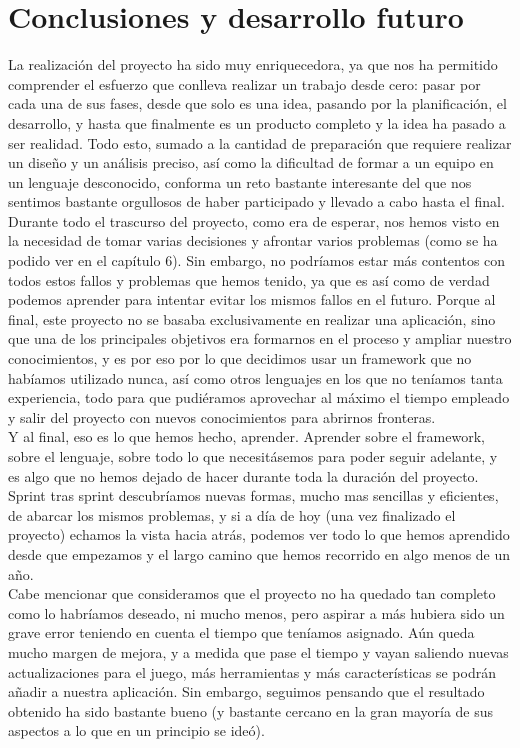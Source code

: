 \chapter{Conclusiones y desarrollo futuro}\label{pruebas}

La realización del proyecto ha sido muy enriquecedora, ya que nos ha permitido comprender el esfuerzo que conlleva realizar un trabajo desde cero: pasar por cada una de sus fases, desde que solo es una idea, pasando por la planificación, el desarrollo, y hasta que finalmente es un producto completo y la idea ha pasado a ser realidad. Todo esto, sumado a la cantidad de preparación que requiere realizar un diseño y un análisis preciso, así como la dificultad de formar a un equipo en un lenguaje desconocido, conforma un reto bastante interesante del que nos sentimos bastante orgullosos de haber participado y llevado a cabo hasta el final.\\

Durante todo el trascurso del proyecto, como era de esperar, nos hemos visto en la necesidad de tomar varias decisiones y afrontar varios problemas (como se ha podido ver en el capítulo 6). Sin embargo, no podríamos estar más contentos con todos estos fallos y problemas que hemos tenido, ya que es así como de verdad podemos aprender para intentar evitar los mismos fallos en el futuro. Porque al final, este proyecto no se basaba exclusivamente en realizar una aplicación, sino que una de los principales objetivos era formarnos en el proceso y ampliar nuestro conocimientos, y es por eso por lo que decidimos usar un framework que no habíamos utilizado nunca, así como otros lenguajes en los que no teníamos tanta experiencia, todo para que pudiéramos aprovechar al máximo el tiempo empleado y salir del proyecto con nuevos conocimientos para abrirnos fronteras.\\

Y al final, eso es lo que hemos hecho, aprender. Aprender sobre el framework, sobre el lenguaje, sobre todo lo que necesitásemos para poder seguir adelante, y es algo que no hemos dejado de hacer durante toda la duración del proyecto. Sprint tras sprint descubríamos nuevas formas, mucho mas sencillas y eficientes, de abarcar los mismos problemas, y si a día de hoy (una vez finalizado el proyecto) echamos la vista hacia atrás, podemos ver todo lo que hemos aprendido desde que empezamos y el largo camino que hemos recorrido en algo menos de un año.\\

Cabe mencionar que consideramos que el proyecto no ha quedado tan completo como lo habríamos deseado, ni mucho menos, pero aspirar a más hubiera sido un grave error teniendo en cuenta el tiempo que teníamos asignado. Aún queda mucho margen de mejora, y a medida que pase el tiempo y vayan saliendo nuevas actualizaciones para el juego, más herramientas y más características se podrán añadir a nuestra aplicación. Sin embargo, seguimos pensando que el resultado obtenido ha sido bastante bueno (y bastante cercano en la gran mayoría de sus aspectos a lo que en un principio se ideó).\\

